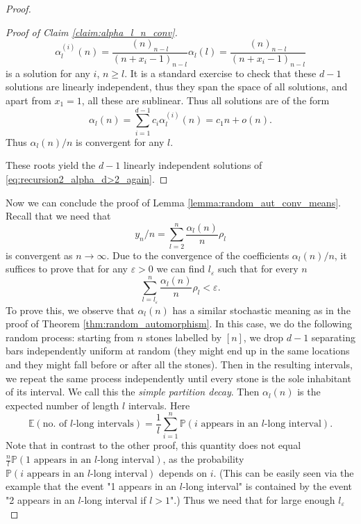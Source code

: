 \documentclass[11pt]{article}
\newcommand{\PP}{\mathbb{P}}
\newcommand{\EE}{\mathbb{E}}
\theoremstyle{definition}
\begin{document}
\begin{proof}
\begin{proof}[Proof of Claim \ref{claim:alpha_l_n_conv}]
    $$\alpha_l^{(i)}(n) = \frac{(n)_{n-l}}{(n+x_i-1)_{n-l}}\alpha_l(l)=\frac{(n)_{n-l}}{(n+x_i-1)_{n-l}}$$
    is a solution for any $i$, $n\geq l$. It is a standard exercise to check that these $d-1$ solutions are linearly independent, thus they span the space of all solutions, and apart from $x_1=1$, all these are sublinear. Thus all solutions are of the form
    $$\alpha_l(n)=\sum_{i=1}^{d-1}c_i\alpha_l^{(i)}(n) =c_1n+o(n).$$
    Thus $\alpha_l(n)/n$ is convergent for any $l$.
    
    These roots yield the $d-1$ linearly independent solutions of \eqref{eq:recursion2_alpha_d>2_again}. 
    \end{proof}

    Now we can conclude the proof of Lemma \ref{lemma:random_aut_conv_means}. Recall that we need that
    \begin{equation}\label{eq:y_n_from_rho}
    y_n/n =\sum_{l=2}^{n}\frac{\alpha_l(n)}{n}\rho_l
    \end{equation}
    is convergent as $n\to\infty$. Due to the convergence of the coefficients $\alpha_l(n)/n$, it suffices to prove that for any $\varepsilon>0$ we can find $l_\varepsilon$ such that for every $n$
    $$\sum_{l=l_\varepsilon}^{n}\frac{\alpha_l(n)}{n}\rho_l<\varepsilon.$$
    To prove this, we observe that $\alpha_l(n)$ has a similar stochastic meaning as in the proof of Theorem \ref{thm:random_automorphism}. In this case, we do the following random process: starting from $n$ stones labelled by $[n]$, we drop $d-1$ separating bars independently uniform at random (they might end up in the same locations and they might fall before or after all the stones). Then in the resulting intervals, we repeat the same process independently until every stone is the sole inhabitant of its interval. We call this the {\it simple partition decay}. Then $\alpha_l(n)$ is the expected number of length $l$ intervals. Here
    \begin{equation}\label{eq:alpha_stochastic_meaning}
    \EE(\text{no. of $l$-long intervals})=\frac{1}{l}\sum_{i=1}^n\PP(\text{$i$ appears in an $l$-long interval}).
    \end{equation}
    Note that in contrast to the other proof, this quantity does not equal
    $\frac{n}{l}\PP(\text{1 appears in an $l$-long interval})$, as the probability $\PP(\text{$i$ appears in an $l$-long interval})$ depends on $i$. (This can be easily seen via the example that the event "1 appears in an $l$-long interval" is contained by the event "2 appears in an $l$-long interval if $l>1$".) Thus we need that for large enough $l_\varepsilon$

\end{proof}
\end{document}
